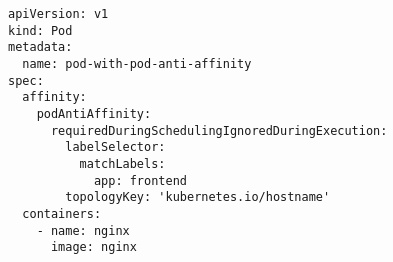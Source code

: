 \begin{verbatim}
apiVersion: v1
kind: Pod
metadata:
  name: pod-with-pod-anti-affinity
spec:
  affinity:
    podAntiAffinity:
      requiredDuringSchedulingIgnoredDuringExecution:
        labelSelector:
          matchLabels:
            app: frontend
        topologyKey: 'kubernetes.io/hostname'
  containers:
    - name: nginx
      image: nginx
\end{verbatim}